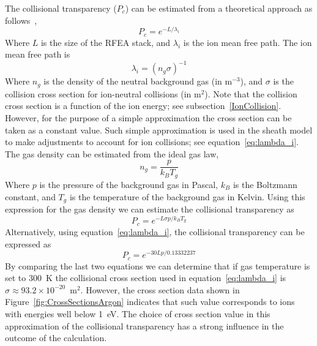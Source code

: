 The collisional transparency ($P_c$) can be estimated from a theoretical approach as follows~\cite{Baloniak2010}, 
\begin{equation}
P_c = e^{- L / \lambda_i} 
\end{equation}
Where $L$ is the size of the RFEA stack, and $\lambda_i$ is the ion mean free path. The ion mean free path is
\begin{equation}
\lambda_i = (n_g \sigma)^{-1}
\end{equation}
Where $n_g$ is the density of the neutral background gas (in m$^{-3}$), and $\sigma$ is the collision cross section for ion-neutral collisions (in m$^2$). Note that the collision cross section is a function of the ion energy; see subsection~\ref{IonCollision}. However, for the purpose of a simple approximation the cross section can be taken as a constant value. Such simple approximation is used in the sheath model to make adjustments to account for ion collisions; see equation~\ref{eq:lambda_i}. The gas density can be estimated from the ideal gas law, 
\begin{equation}
n_g = \frac{p}{k_B T_g}
\end{equation}    
Where $p$ is the pressure of the background gas in Pascal, $k_B$ is the Boltzmann constant, and $T_g$ is the temperature of the background gas in Kelvin. Using this expression for the gas density we can estimate the collisional transparency as
\begin{equation}
P_c = e^{- L \sigma p / k_B T_g}
\end{equation}
Alternatively, using equation~\ref{eq:lambda_i}, the collisional transparency can be expressed as
\begin{equation}\label{eq:CollisionalTrasparency}
P_c = e^{- 30 L p / 0.13332237}
\end{equation}
By comparing the last two equations we can determine that if gas temperature is set to 300~K the collisional cross section used in equation~\ref{eq:lambda_i} is $\sigma \approx 93.2 \times 10^{-20}$~m$^2$. However, the cross section data shown in Figure~\ref{fig:CrossSectionsArgon} indicates that such value corresponds to ions with energies well below 1~eV. The choice of cross section value in this approximation of the collisional transparency has a strong influence in the outcome of the calculation.  

